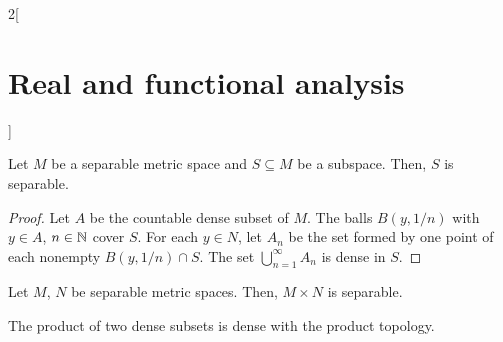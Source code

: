 \documentclass[../../../main_math.tex]{subfiles}
\begin{document}
\begin{multicols}{2}[\section{Real and functional analysis}]
\begin{sproof}
  \end{sproof}
  \begin{proposition}
    Let $M$ be a separable metric space and $S\subseteq M$ be a subspace. Then, $S$ is separable.
  \end{proposition}
  \begin{proof}
    Let $A$ be the countable dense subset of $M$. The balls $B(y,1/n)$ with $y\in A$, $n\in\mathbb{N}$ cover $S$. For each $y\in N$, let $A_n$ be the set formed by one point of each nonempty $B(y,1/n)\cap S$. The set $\bigcup_{n=1}^\infty A_n$ is dense in $S$.
  \end{proof}
  \begin{proposition}
    Let $M$, $N$ be separable metric spaces. Then, $M\times N$ is separable.
  \end{proposition}
  \begin{sproof}
    The product of two dense subsets is dense with the product topology.
  \end{sproof}

\end{multicols}
\end{document}
